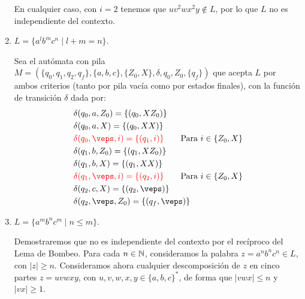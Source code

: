 \begin{ejercicio}
\begin{enumerate}
        En cualquier caso, con $i=2$ tenemos que $uv^2wx^2y\notin L$, por lo que $L$ no es independiente del contexto.

        \item $L = \{a^l b^m c^n \mid l + m = n\}$.
        
        Sea el autómata con pila $M = (\{q_0,q_1,q_2,q_f\},\{a,b,c\},\{Z_0,X\},\delta,q_0,Z_0,\{q_f\})$ que acepta $L$ por ambos criterios (tanto por pila vacía como por estados finales), con la función de transición $\delta$ dada por:
        \begin{align*}
            &\delta(q_0,a,Z_0) = \{(q_0,XZ_0)\} \\
            &\delta(q_0,a,X) = \{(q_0,XX)\} \\
            &\red{\delta(q_0,\veps,i) = \{(q_1,i)\}} \qquad \text{Para } i\in \{Z_0,X\} \\
            &\delta(q_1,b,Z_0) = \{(q_1,XZ_0)\} \\
            &\delta(q_1,b,X) = \{(q_1,XX)\} \\
            &\red{\delta(q_1,\veps,i) = \{(q_2,i)\}} \qquad \text{Para } i\in \{Z_0,X\} \\
            &\delta(q_2,c,X) = \{(q_2,\veps)\} \\
            &\delta(q_2,\veps,Z_0) = \{(q_f,\veps)\}
        \end{align*}
        \item $L = \{a^m b^n c^m \mid n\leq m\}$.
        
        Demostraremos que no es independiente del contexto por el recíproco del Lema de Bombeo. Para cada $n\in \mathbb{N}$, consideramos la palabra $z=a^{n}b^nc^{n}\in L$, con $|z|\geq n$. Consideramos ahora cualquier descomposición de $z$ en cinco partes $z=uvwxy$, con $u,v,w,x,y\in {\{a,b,c\}}^{\ast}$, de forma que $|vwx|\leq n$ y $|vx|\geq 1$.


\end{enumerate}
\end{ejercicio}
